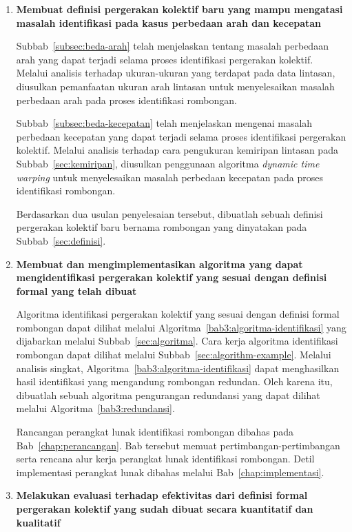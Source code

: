 \begin{enumerate}
    \item \textbf{Membuat definisi pergerakan kolektif baru yang mampu mengatasi masalah identifikasi pada kasus perbedaan arah dan kecepatan}
    
    Subbab~\ref{subsec:beda-arah} telah menjelaskan tentang masalah perbedaan arah yang dapat terjadi selama proses identifikasi pergerakan kolektif. Melalui analisis terhadap ukuran-ukuran yang terdapat pada data lintasan, diusulkan pemanfaatan ukuran arah lintasan untuk menyelesaikan masalah perbedaan arah pada proses identifikasi rombongan.
    
    Subbab~\ref{subsec:beda-kecepatan} telah menjelaskan mengenai masalah perbedaan kecepatan yang dapat terjadi selama proses identifikasi pergerakan kolektif. Melalui analisis terhadap cara pengukuran kemiripan lintasan pada Subbab~\ref{sec:kemiripan}, diusulkan penggunaan algoritma \textit{dynamic time warping} untuk menyelesaikan masalah perbedaan kecepatan pada proses identifikasi rombongan.
    
    Berdasarkan dua usulan penyelesaian tersebut, dibuatlah sebuah definisi pergerakan kolektif baru bernama rombongan yang dinyatakan pada Subbab~\ref{sec:definisi}.
    
    \item \textbf{Membuat dan mengimplementasikan algoritma yang dapat mengidentifikasi pergerakan kolektif yang sesuai dengan definisi formal yang telah dibuat}
    
    Algoritma identifikasi pergerakan kolektif yang sesuai dengan definisi formal rombongan dapat dilihat melalui Algoritma~\ref{bab3:algoritma-identifikasi} yang dijabarkan melalui Subbab~\ref{sec:algoritma}. Cara kerja algoritma identifikasi rombongan dapat dilihat melalui Subbab~\ref{sec:algorithm-example}. Melalui analisis singkat, Algoritma~\ref{bab3:algoritma-identifikasi} dapat menghasilkan hasil identifikasi yang mengandung rombongan redundan. Oleh karena itu, dibuatlah sebuah algoritma pengurangan redundansi yang dapat dilihat melalui Algoritma~\ref{bab3:redundansi}.
    
    Rancangan perangkat lunak identifikasi rombongan dibahas pada Bab~\ref{chap:perancangan}. Bab tersebut memuat pertimbangan-pertimbangan serta rencana alur kerja perangkat lunak identifikasi rombongan. Detil implementasi perangkat lunak dibahas melalui Bab~\ref{chap:implementasi}.
    
    \item \textbf{Melakukan evaluasi terhadap efektivitas dari definisi formal pergerakan kolektif yang sudah dibuat secara kuantitatif dan kualitatif}
    

\end{enumerate}

